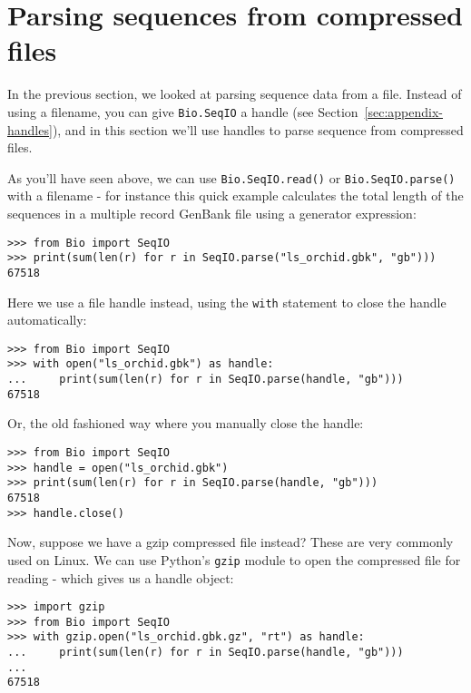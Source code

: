 \section{Parsing sequences from compressed files}
\label{sec:SeqIO_compressed}
In the previous section, we looked at parsing sequence data from a file.
Instead of using a filename, you can give \verb|Bio.SeqIO| a handle
(see Section~\ref{sec:appendix-handles}), and in this section
we'll use handles to parse sequence from compressed files.

As you'll have seen above, we can use \verb|Bio.SeqIO.read()| or
\verb|Bio.SeqIO.parse()| with a filename - for instance this quick
example calculates the total length of the sequences in a multiple
record GenBank file using a generator expression:

\begin{verbatim}
>>> from Bio import SeqIO
>>> print(sum(len(r) for r in SeqIO.parse("ls_orchid.gbk", "gb")))
67518
\end{verbatim}

\noindent
Here we use a file handle instead, using the \verb|with| statement
to close the handle automatically:

\begin{verbatim}
>>> from Bio import SeqIO
>>> with open("ls_orchid.gbk") as handle:
...     print(sum(len(r) for r in SeqIO.parse(handle, "gb")))
67518
\end{verbatim}

\noindent
Or, the old fashioned way where you manually close the handle:

\begin{verbatim}
>>> from Bio import SeqIO
>>> handle = open("ls_orchid.gbk")
>>> print(sum(len(r) for r in SeqIO.parse(handle, "gb")))
67518
>>> handle.close()
\end{verbatim}

Now, suppose we have a gzip compressed file instead? These are very
commonly used on Linux. We can use Python's \verb|gzip| module to open
the compressed file for reading - which gives us a handle object:

\begin{verbatim}
>>> import gzip
>>> from Bio import SeqIO
>>> with gzip.open("ls_orchid.gbk.gz", "rt") as handle:
...     print(sum(len(r) for r in SeqIO.parse(handle, "gb")))
...
67518
\end{verbatim}


